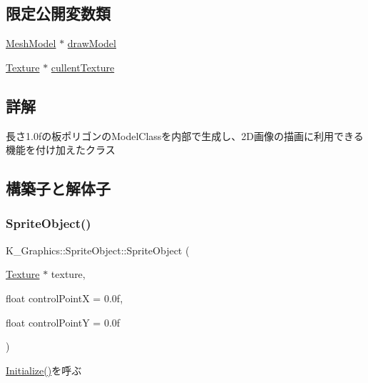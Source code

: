 \subsection*{限定公開変数類}
\begin{DoxyCompactItemize}
\item 
\mbox{\hyperlink{class_k___graphics_1_1_mesh_model}{Mesh\+Model}} $\ast$ \mbox{\hyperlink{class_k___graphics_1_1_sprite_object_a91966c81a550dd6b04ccc0bd210c289d}{draw\+Model}}
\item 
\mbox{\hyperlink{class_k___graphics_1_1_texture}{Texture}} $\ast$ \mbox{\hyperlink{class_k___graphics_1_1_sprite_object_a7cf528d065c242528bf0bd407a139f09}{cullent\+Texture}}
\end{DoxyCompactItemize}


\subsection{詳解}
長さ1.0fの板ポリゴンの\+Model\+Classを内部で生成し、2\+D画像の描画に利用できる機能を付け加えたクラス 

\subsection{構築子と解体子}
\mbox{\label{class_k___graphics_1_1_sprite_object_a9fe538248d36f9b2c20688f0053af112}} 
\subsubsection{\texorpdfstring{Sprite\+Object()}{SpriteObject()}}
{\footnotesize\ttfamily K\+\_\+\+Graphics\+::\+Sprite\+Object\+::\+Sprite\+Object (\begin{DoxyParamCaption}\item[{\mbox{\hyperlink{class_k___graphics_1_1_texture}{Texture}} $\ast$}]{texture,  }\item[{float}]{control\+PointX = {\ttfamily 0.0f},  }\item[{float}]{control\+PointY = {\ttfamily 0.0f} }\end{DoxyParamCaption})}



\mbox{\hyperlink{class_k___graphics_1_1_sprite_object_a7c0ebb444b7484f20c10ba657060d779}{Initialize()}}を呼ぶ 

